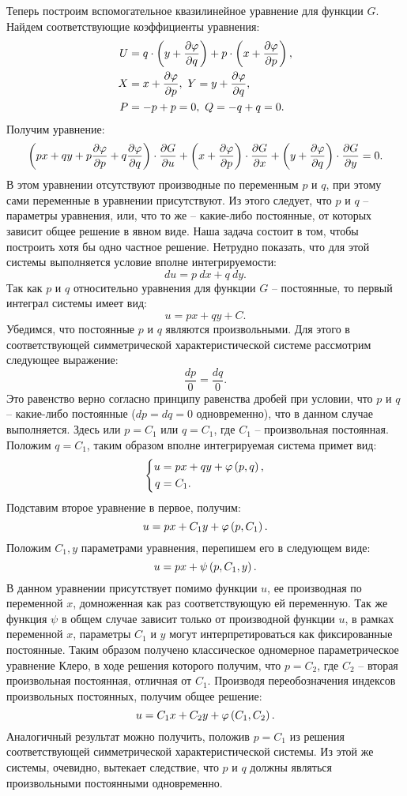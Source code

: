 	Теперь построим вспомогательное квазилинейное уравнение для функции $G$. Найдем соответствующие коэффициенты уравнения:
	\[ \begin{split}
		U &= q \cdot \left( y + \dfrac{\partial \varphi}{\partial q} \right) + p \cdot \left( x + \dfrac{\partial \varphi}{\partial p} \right), \\
		X &= x + \dfrac{\partial \varphi}{\partial p}, ~ Y = y + \dfrac{\partial \varphi}{\partial q}, \\
		P &= - p + p = 0, ~ Q = - q + q = 0.
	\end{split} \] 
	Получим уравнение:
	\[ \left( px + qy + p\dfrac{\partial \varphi}{\partial p} + q \dfrac{\partial \varphi}{\partial q} \right) \cdot \dfrac{\partial G}{\partial u} + \left( x + \dfrac{\partial \varphi}{\partial p} \right) \cdot \dfrac{\partial G}{\partial x} + \left( y + \dfrac{\partial \varphi}{\partial q} \right) \cdot \dfrac{\partial G}{\partial y} = 0. \]
	В этом уравнении отсутствуют производные по переменным $p$ и $q$, при этому сами переменные в уравнении присутствуют. Из этого следует, что $p$ и $q$ -- параметры уравнения, или, что то же -- какие-либо постоянные, от которых зависит общее решение в явном виде. Наша задача состоит в том, чтобы построить хотя бы одно частное решение. Нетрудно показать, что для этой системы выполняется условие вполне интегрируемости:
	\[ du = p ~ dx + q ~ dy. \]
	Так как $p$ и $q$ относительно уравнения для функции $G$ -- постоянные, то первый интеграл системы имеет вид:
	\[ u = px + qy + C. \]
	Убедимся, что постоянные $p$ и $q$ являются произвольными. Для этого в соответствующей симметрической характеристической системе рассмотрим следующее выражение:
	\[ \frac{dp}{0} = \frac{dq}{0}. \]
	Это равенство верно согласно принципу равенства дробей при условии, что $p$ и $q$ -- какие-либо постоянные ($dp = dq = 0$ одновременно), что в данном случае выполняется. Здесь или $p = C_1$ или $q = C_1$, где $C_1$ -- произвольная постоянная. Положим $q = C_1$, таким образом вполне интегрируемая система примет вид:
	\[ \left\lbrace \begin{split}
		u &= px + qy + \varphi \left( p, q \right), \\
		q &= C_1.
	\end{split} \right. \]
	Подставим второе уравнение в первое, получим:
	\[ u = p x + C_1 y + \varphi \left( p, C_1 \right). \]
	Положим $C_1, y$ параметрами уравнения, перепишем его в следующем виде:
	\[ u = px + \psi \left( p, C_1, y \right). \]
	В данном уравнении присутствует помимо функции $u$, ее производная по переменной $x$, домноженная как раз соответствующую ей переменную. Так же функция $\psi$ в общем случае зависит только от производной функции $u$, в рамках переменной $x$, параметры $C_1$ и $y$ могут интерпретироваться как фиксированные постоянные. Таким образом получено классическое одномерное параметрическое уравнение Клеро, в ходе решения которого получим, что $p = C_2$, где $C_2$ -- вторая произвольная постоянная, отличная от $C_1$. Производя переобозначения индексов произвольных постоянных, получим общее решение:
	\[ u = C_1 x + C_2 y + \varphi \left( C_1, C_2 \right). \]
	Аналогичный результат можно получить, положив $p = C_1$ из решения соответствующей симметрической характеристической системы. Из этой же системы, очевидно, вытекает следствие, что $p$ и $q$ должны являться произвольными постоянными одновременно.

